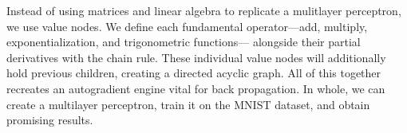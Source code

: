Instead of using matrices and linear algebra to replicate 
a mulitlayer perceptron, we use value nodes. We define each
fundamental operator---add, multiply, exponentialization, and trigonometric functions--- 
alongside their partial derivatives with the chain rule.
These individual value nodes will additionally hold previous children, creating a
directed acyclic graph. All of this together recreates an autogradient engine
vital for back propagation. In whole, we can create a multilayer perceptron, train it on 
the MNIST dataset, and obtain promising results.
